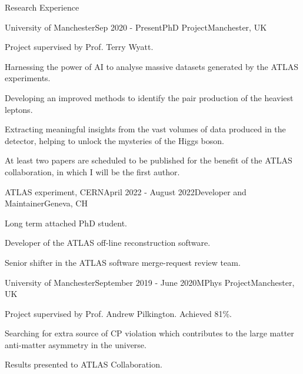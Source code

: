 \documentclass{resume} %
\begin{document}
    \begin{rSection}{Research Experience}
        \begin{rSubsection}{University of Manchester}{Sep 2020 - Present}{PhD Project}{Manchester, UK}
            \item Project supervised by Prof. Terry Wyatt.
            \item Harnessing the power of AI to analyse massive datasets generated by the ATLAS experiments. 
            \item Developing an improved methods to identify the pair production of the heaviest leptons.
            \item Extracting meaningful insights from the vast volumes of data produced in the detector, helping to unlock the mysteries of the Higgs boson.
            \item At least two papers are scheduled to be published for the benefit of the ATLAS collaboration, in which I will be the first author.
        \end{rSubsection}
        \begin{rSubsection}{ATLAS experiment, CERN}{April 2022 - August 2022}{Developer and Maintainer}{Geneva, CH}
            \item Long term attached PhD student.
            \item Developer of the ATLAS off-line reconstruction software.
            \item Senior shifter in the ATLAS software merge-request review team.
        \end{rSubsection}
        \begin{rSubsection}{University of Manchester}{September 2019 - June 2020}{MPhys Project}{Manchester, UK}
            \item   Project supervised by Prof. Andrew Pilkington. Achieved 81\%.
            \item   Searching for extra source of CP violation which contributes to the large matter anti-matter asymmetry in the universe.
            \item   Results presented to ATLAS Collaboration. 
        \end{rSubsection}
    \end{rSection}
\end{document}
